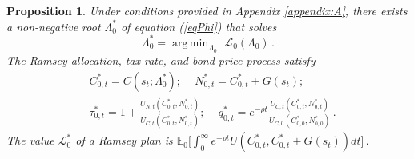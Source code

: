 \documentclass[12pt]{article}
\DeclareMathOperator*{\argmin}{arg\,min}
\newtheorem{proposition}{Proposition}
\newcommand{\NW}[1]{{\textcolor{blue}{#1}}}
\begin{document}



\begin{proposition} \label{proplag} 
	Under  conditions provided in  Appendix \ref{appendix:A}, there  exists  a non-negative root  $\Lambda_0^*$ of equation (\ref{eqPhi}) that solves
	\begin{equation*}
		\Lambda_0^*  = \argmin_{\Lambda_0}  \,\,  \mathcal{L}_0(\Lambda_0)\, . %
	\end{equation*}	
	 The    Ramsey allocation,  tax rate, and bond price  process satisfy
	\begin{eqnarray*}
		&	 {C}^\ast_{0, t} =     C(s_t; \Lambda_0^*); \, \quad 
		{N}^*_{0, t}  =    {C}_{0, t}^\ast +G(s_t) ;  \\
		&	  {\tau}^*_{0, t} =  1+\frac{U_{N, t}({C}^*_{0, t}, {N}^*_{0, t})}{U_{C, t}({C}^*_{0, t}, {N}^*_{0, t})};\,   \quad
		{q}^*_{0,t}  = e^{-\rho t}\frac{U_{C, t}({C}^*_{0, t}, {N}^*_{0, t})}{U_{C, 0}({C}^*_{0, 0}, {N}^*_{0, 0})}\, .
	\end{eqnarray*} 
	The value ${\mathcal L}^{*}_0 $ of a Ramsey plan is
		$	{\mathbb E}_0 \big[ \int_{0}^{\infty}  e^{-\rho t} U(	{C}^*_{0, t}, {C}^*_{0, t}+G(s_t))  dt \big] \, .
		$	%
	\end{proposition}
\end{document}
